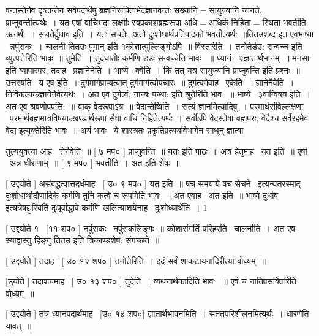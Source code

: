 \documentclass[11pt, openany]{book}
\begin{document}
 वन्तस्तेनैव दृष्टान्तेन सर्वपदार्थेषु ब्रह्मनिरूपिताभेदज्ञानवन्तः
सख्यानि$=$सायुज्यानि जानते, प्राप्नुवन्तीत्यर्थः~। यत एषां वाचिभद्रा
लक्ष्मीः स्वप्रकाशब्रह्मरूपा अधि$=$अधिकं निहिता$=$स्थिता भवतीति ऋगर्थ:~। 
सचतेर्दुधाव इति~। यतः सचतेः, अतो दुःशोधार्थप्रतिपादको
भवतीत्यर्थः~॥तितउशब्द इत एवभाष्या \textendash\ न्नपुंसकः~। {\qt चालनी तितउः पुमान्} इति
१कोशात्पुल्लिङ्गोऽपि~॥ विस्तारेति~। {\qt तनोतेर्डउ:} सन्वच्च इति
व्युत्पत्तेरिति भावः~॥ तुमेति~। तुदधातोः कर्मणि डउः सन्वच्चेति भावः
~॥ ध्यानं \textendash\ २ज्ञातार्थभानम्~॥ {\qt मनसा इति व्यापारपर,}
तदाह \textendash\ प्रज्ञानेनेति~॥ भाष्ये \textendash\ क्वेति~। {\qt र्कि तत् यत्र सायुज्यानि
प्राप्नुवन्ति} इति प्रश्नः~॥ उत्तरयति \textendash\ य एष इति~। 
दुर्गमार्गप्राप्यत्वात् दुर्गमार्गत्वोपचारः~॥ दुर्गत्वमेवाह \textendash\ एकेति~॥
ज्ञानेनैवेति~। निर्विकल्पकज्ञानेनैवेत्यर्थः~। अत एव दुर्गत्वं, {\qt नान्यः
पन्था:} इति श्रुतेरिति भाव:~॥ भाष्ये \textendash\ ३वाग्विषय इति~। अत एव
श्रवणोपपत्ति:~॥ वाक् वेदरूपाऽत्र~॥ वेदान्तेष्विति~। सत्यं
ज्ञानमित्यादिषु~। परमार्थसंविल्लक्षणा \textendash\ 
परमार्थब्रह्ममात्रविषयाsखण्डार्थरूपा सैषां वाचि निहितेत्यर्थः~। 
सर्वोऽपि वेदस्तेषां ब्रह्मपरः, वेदैश्च सर्वैरहमेव वेद्य
इत्युक्तेरिति भावः~॥ अयं भावः \textendash\ ये शास्त्रतः प्रकृतिप्रत्ययविभागेन
साधून् ज्ञात्वा 



तुल्ययुक्त्या आह \textendash\ त्तेनैवेति~॥ [ ७ मप० ] प्राप्नुवन्ति~॥ यतः इति
पाठः~॥ अत्र हेतुमाह \textendash\ यत इति~॥ एषां \textendash\ अत्र धीराणाम्~॥ [ ९ मप० ]
भवतीति~। अत इति शेषः~॥ 

 [ उद्द्योते ] असंबद्धत्वात्तदर्धमाह \textendash\ [ उ० ९ मप० ] यत इति~॥ षच
समयाये षच सेचने \textendash\ इत्यन्यतरस्माद् दुःशोधार्थादौणादिके कर्मणि तुनि कत्वे च
रूपमिति भावः~॥ अत एवाह \textendash\ अत इति~॥ भाष्ये दुर्धाव इत्यत्रेषद्दुःस्विति
दुःपूर्वाद्धावे कर्मणि खलित्याशयेनाह \textendash\ दुःशोध्यार्थेति~। 1 

 [ उद्द्योते १ \textendash\ [११ शप० ] नपुंसकः \textendash\ नपुंसकलिङ्गः~॥ कोशासंगतिं
परिहरति \textendash\ चालनीति~। अत एव {\qt स्याद्वास्तु हिङ्गु तितउ इति त्रिकाण्डशेष:
संगच्छते~॥}

 [ उद्द्योते ] तदाह \textendash\ [ उ० १२ शप० ] तनोतेरिति~। इदं सर्वं
शाकटायनादिरीत्या वोध्यम्~॥ 

 [उ्योते ] तदाशयमाह \textendash\ [ उ० १३ शप० ] तुदेति~। व्यथनार्थकादिति भावः
~॥ एवं च नातिप्रसक्तिरिति वोध्यम्~॥ 

 [ उद्दयोते ] तत्र ध्यानपदार्थमाह \textendash\ [उ० १४ शप०]
ज्ञातार्थभावनमिति~। सततपरिशीलनमित्यर्थः~। धारणेति यावत्~॥ 
\end{document}
